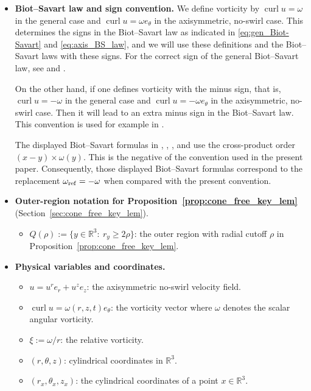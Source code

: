 \documentclass[reqno,11pt]{amsart}
\begin{document}
\begin{itemize}
\item \textbf{Biot--Savart law and sign convention.}
We define vorticity by $\operatorname{curl}u=\omega$ in the general case and $\operatorname{curl}u= \omega e_\theta$ in the axisymmetric, no-swirl case. This determines the signs in the Biot--Savart law as indicated in \eqref{eq:gen_Biot-Savart} and \eqref{eq:axis_BS_law}, and we will use these definitions and the Biot--Savart laws with these signs. For the correct sign of the general Biot--Savart law, see \cite[the first page]{EncisoGarciaFerreroPeraltaSalas18} and \cite[Equation (1.44)]{Tsai18}. 

On the other hand, if one defines vorticity with the minus sign, that is, $\operatorname{curl}u=-\omega$ in the general case and $\operatorname{curl}u= -\omega e_\theta$ in the axisymmetric, no-swirl case. Then it will lead to an extra minus sign in the Biot--Savart law. This convention is used for example in \cite[Equations (1.3), (1.5), (1.6)]{KimJeong22}.

The displayed Biot--Savart formulas in
\cite[Equation (3)]{CordobaMartinezZheng25},
\cite[Equations (2.94), (2.95)]{MajdaBertozzi01},
\cite[Equation (1.53)]{BedrossianVicol22}, and
\cite[p.~477]{Danchin07}
use the cross-product order \((x-y)\times\omega(y)\). This is the negative of
the convention used in the present paper.
Consequently, those displayed Biot--Savart formulas correspond to the replacement
\(\omega_{\rm ref}=-\omega\) when compared with the present convention.

\item \textbf{Outer-region notation for  Proposition~\ref{prop:cone_free_key_lem}}
(Section~\ref{sec:cone_free_key_lem}).
\begin{itemize}
    \item $Q(\rho):=\{y\in\mathbb R^3:\ r_y\ge2\rho\}$:
the outer region with radial cutoff $\rho$ in Proposition~\ref{prop:cone_free_key_lem}.
\end{itemize}

\item \textbf{Physical variables and coordinates.}
\begin{itemize}
    \item $u=u^r e_r+u^z e_z$: the axisymmetric no-swirl velocity field.
   \item $\operatorname{curl}u=\omega(r,z,t)e_\theta$: the vorticity vector where $\omega$ denotes the scalar angular vorticity.
    \item $\xi:=\omega/r$: the relative vorticity.
    \item $(r,\theta,z)$: cylindrical coordinates in $\mathbb R^3$.
    \item $(r_x,\theta_x,z_x)$: the cylindrical coordinates of a point $x\in\mathbb R^3$.
\end{itemize}


\end{itemize}
\end{document}
